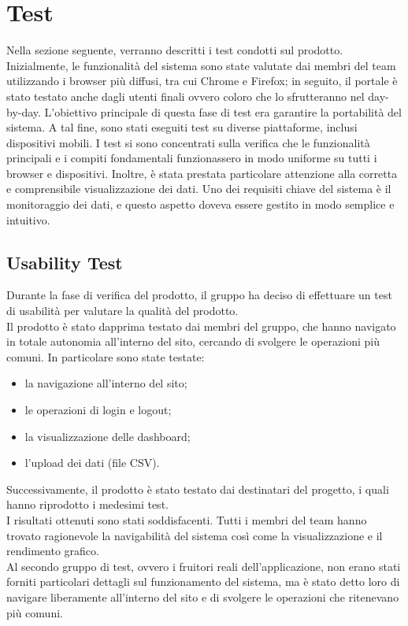 \section*{Test}
Nella sezione seguente, verranno descritti i test condotti sul prodotto.\\

Inizialmente, le funzionalità del sistema sono state valutate dai
membri del team utilizzando i browser più diffusi, tra cui Chrome e
Firefox; in seguito, il portale è stato testato anche dagli utenti finali ovvero coloro che lo sfrutteranno nel day-by-day. L'obiettivo principale di questa fase di test era garantire la portabilità del sistema.
A tal fine, sono stati eseguiti test su diverse piattaforme, inclusi dispositivi mobili. I test si sono concentrati sulla verifica che le funzionalità principali e i compiti fondamentali funzionassero in modo uniforme su tutti i browser e dispositivi. Inoltre, è stata prestata particolare attenzione alla corretta e comprensibile visualizzazione dei dati. Uno dei requisiti chiave del sistema è il monitoraggio dei dati, e questo aspetto doveva essere gestito in modo semplice e intuitivo.\\
\subsection*{Usability Test}
Durante la fase di verifica del prodotto, il gruppo ha deciso di effettuare
un test di usabilità per valutare la qualità del prodotto.\\

Il prodotto è stato dapprima testato dai membri del gruppo, che hanno
navigato in totale autonomia all'interno del sito, cercando di svolgere 
le operazioni più comuni. In particolare sono state testate:
\begin{itemize}
    \item la navigazione all'interno del sito;
    \item le operazioni di login e logout;
    \item la visualizzazione delle dashboard;
    \item l'upload dei dati (file CSV).
\end{itemize}
Successivamente, il prodotto è stato testato dai destinatari del progetto, i quali hanno riprodotto i medesimi
test.\\

I risultati ottenuti sono stati soddisfacenti. Tutti i membri del team hanno
trovato ragionevole la navigabilità del sistema così come la visualizzazione e 
il rendimento grafico.\\
Al secondo gruppo di test, ovvero i fruitori reali dell'applicazione, non erano stati forniti particolari dettagli sul funzionamento del sistema, ma
è stato detto loro di navigare liberamente all'interno del sito e di svolgere le operazioni che ritenevano più comuni.\\

